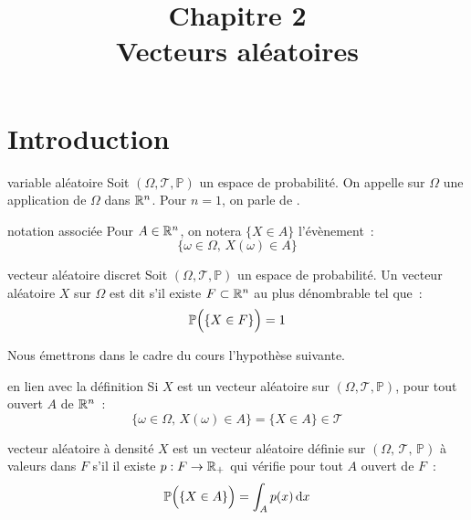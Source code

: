 
\usepackage{dsfont}

\setcounter{chapitre}{2}

\title{\Large Chapitre 2 \\ \Huge Vecteurs aléatoires}



\maketitle


\newcommand{\tribu}[0]{\mathcal{T}}
\newcommand{\univ}[0]{\Omega}
\newcommand{\proba}[0]{\mathbb{P}}
\newcommand{\probaset}[1]{\mathbb{P}\big(\{#1\}\big)}



\section{Introduction}
\begin{definition}{}{variable aléatoire}
    Soit $(\univ, \tribu, \proba)$ un espace de probabilité. On appelle  sur $\univ$ une application de $\univ$ dans $\mathbb{R}^n$.
    Pour $n=1$, on parle de .
\end{definition}

\begin{remarque}{}{notation associée}
    Pour $A \in \mathbb{R}^n$, on notera $\{X \in A\}$ l'évènement~:
    $$\{\omega \in \univ,\, X(\omega) \in A\}$$
\end{remarque}

\begin{definition}{}{vecteur aléatoire discret}
    Soit $(\univ, \tribu, \proba)$ un espace de probabilité. Un vecteur aléatoire $X$ sur $\Omega$ est dit  s'il existe $F \subset \mathbb{R}^n$ au plus dénombrable tel que~:
    $$\proba\Bigl(\{X \in F\}\Bigr) = 1$$
    
\end{definition}


Nous émettrons dans le cadre du cours l'hypothèse suivante.
\begin{remarque}{}{en lien avec la définition}
    Si $X$ est un vecteur aléatoire sur $(\univ, \tribu, \proba)$, pour tout ouvert $A$ de $\mathbb{R}^n$~:
    $$\{\omega \in \univ,\, X(\omega) \in A\} = \{X \in A\} \in \tribu$$
\end{remarque}

\begin{definition}{}{vecteur aléatoire à densité}
    $X$ est un vecteur aléatoire définie sur $(\univ,\, \tribu,\, \proba)$ à valeurs dans $F$ s'il il existe $p : F \to \mathbb{R}_+$ qui vérifie pour tout $A$ ouvert de $F$~:
    $$\proba\Big(\{X \in A\}\Big) = \int_A p(x)\d{x}$$
\end{definition}


